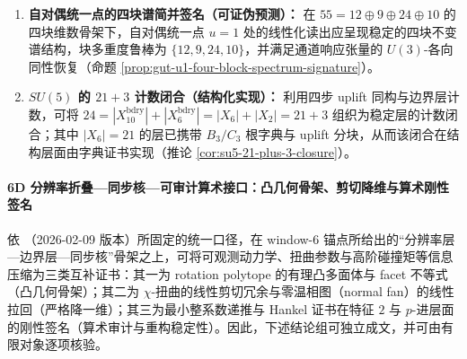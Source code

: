 \begin{theorem}
\begin{enumerate}
  \item \textbf{自对偶统一点的四块谱简并签名（可证伪预测）：}
  在 \(55=12\oplus 9\oplus 24\oplus 10\) 的四块维数骨架下，自对偶统一点 \(u=1\) 处的线性化读出应呈现稳定的四块不变谱结构，块多重度鲁棒为 \(\{12,9,24,10\}\)，并满足通道响应张量的 \(U(3)\)-各向同性恢复（命题 \ref{prop:gut-u1-four-block-spectrum-signature}）。

  \item \textbf{\texorpdfstring{$SU(5)$}{SU(5)} 的 \(21+3\) 计数闭合（结构化实现）：}
  利用四步 uplift 同构与边界层计数，可将
  \(
  24=|X_{10}^{\mathrm{bdry}}|+|X_6^{\mathrm{bdry}}|
  =|X_6|+|X_2|=21+3
  \)
  组织为稳定层的计数闭合；其中 \(|X_6|=21\) 的层已携带 \(B_3/C_3\) 根字典与 uplift 分块，从而该闭合在结构层面由字典证书实现（推论 \ref{cor:su5-21-plus-3-closure}）。
\end{enumerate}
\end{theorem}

\paragraph{6D 分辨率折叠—同步核—可审计算术接口：凸几何骨架、剪切降维与算术刚性签名}
依 \cite{Internal2026POMGenerativeAddressThreeRegisterBridgeRH}（2026-02-09 版本）所固定的统一口径，在 window-\(6\) 锚点所给出的“分辨率层—边界层—同步核”骨架之上，可将可观测动力学、扭曲参数与高阶碰撞矩等信息压缩为三类互补证书：其一为 rotation polytope 的有理凸多面体与 facet 不等式（凸几何骨架）；其二为 \(\chi\)-扭曲的线性剪切冗余与零温相图（normal fan）的线性拉回（严格降一维）；其三为最小整系数递推与 Hankel 证书在特征 \(2\) 与 \(p\)-进层面的刚性签名（算术审计与重构稳定性）。因此，下述结论组可独立成文，并可由有限对象逐项核验。

